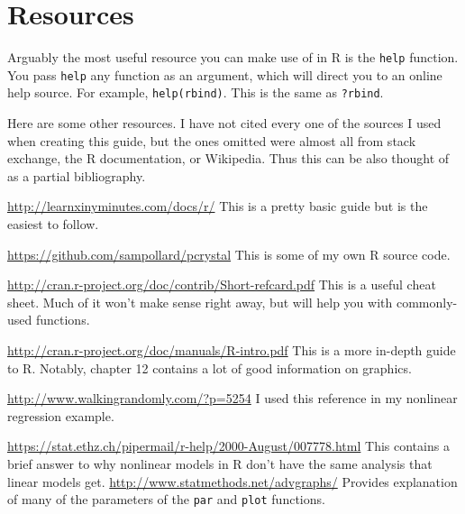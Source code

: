 \documentclass[12pt]{article}
\begin{document}
\vfill
\section{Resources}
Arguably the most useful resource you can make use of in R is the \verb|help| function. You pass \verb|help| any function as an argument, which will direct you to an online help source. For example, \verb|help(rbind)|. This is the same as \verb|?rbind|.

Here are some other resources. I have not cited every one of the sources I used when creating this guide, but the ones omitted were almost all from stack exchange, the R documentation, or Wikipedia. Thus this can be also thought of as a partial bibliography.
\begingroup
\renewcommand{\section}[2]{}%
\begin{thebibliography}{}
		\url{http://learnxinyminutes.com/docs/r/}
		This is a pretty basic guide but is the easiest to follow.
		
		\url{https://github.com/sampollard/pcrystal}
		This is some of my own R source code.
		
		\url{http://cran.r-project.org/doc/contrib/Short-refcard.pdf}
		This is a useful cheat sheet. Much of it won't make sense right away, but will help you with commonly-used functions.
		
		\url{http://cran.r-project.org/doc/manuals/R-intro.pdf}
		This is a more in-depth guide to R. Notably, chapter 12 contains a lot of good information on graphics.
	
		\url{http://www.walkingrandomly.com/?p=5254}
		I used this reference in my nonlinear regression example.
		
		\url{https://stat.ethz.ch/pipermail/r-help/2000-August/007778.html}
		This contains a brief answer to why nonlinear models in R don't have the same analysis that linear models get.
		\url{http://www.statmethods.net/advgraphs/} Provides explanation of many of the parameters of the \verb|par| and \verb|plot| functions.
\end{thebibliography}
\endgroup
\end{document}
